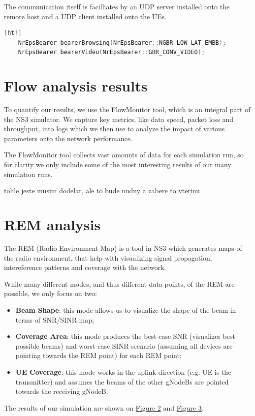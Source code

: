 \documentclass[10pt,a4]{article}
\begin{document}
    The communication itself is facilliates by an UDP server installed onto the remote host and a UDP client installed onto the UEs.
    \begin{lstlisting}[language=C++,caption=Traffic bearer definition.,label=lst:tfts][ht!]
    NrEpsBearer bearerBrowsing(NrEpsBearer::NGBR_LOW_LAT_EMBB);
    NrEpsBearer bearerVideo(NrEpsBearer::GBR_CONV_VIDEO);
    \end{lstlisting}
    \section{Flow analysis results}
    To quantify our results, we use the FlowMonitor tool, which is an integral part of the NS3 simulator. We capture key metrics, like data speed, packet loss and throughput, into logs which we then use to analyze the impact of various parameters onto the network performance.

    The FlowMonitor tool collects vast amounts of data for each simulation run, so for clarity we only include some of the most interesting results of our many simulation runs.

    tohle jeste musim dodelat, ale to bude nudny a zabere to vterinu
    \section{REM analysis}
    The REM (Radio Environment Map) is a tool in NS3 which generates maps of the radio environment, that help with visualizing signal propagation, intereference patterns and coverage with the network.

    While many different modes, and thus different data points, of the REM are possible, we only focus on two:
    \begin{itemize}
        \item \textbf{Beam Shape}: this mode allows us to visualize the shape of the beam in terms of SNR/SINR map;
        \item \textbf{Coverage Area}: this mode produces the best-case SNR (visualizes best possible beams) and worst-case SINR scenario (assuming all devices are pointing towards the REM point) for each REM point;
        \item \textbf{UE Coverage}: this mode works in the uplink direction (e.g. UE is the transmitter) and assumes the beams of the other gNodeBs are pointed towards the receiving gNodeB.
    \end{itemize}

    The results of our simulation are shown on \hyperref[fig:dl]{Figure 2} and \hyperref[fig:ul]{Figure 3}.
\end{document}
